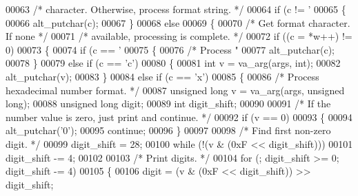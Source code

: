 \begin{DoxyCode}
{{{{00063         \textcolor{comment}{/* character.  Otherwise, process format string. */}
00064         \textcolor{keywordflow}{if} (c != \textcolor{charliteral}{'%
00065         \{
00066             alt_putchar(c);
00067         \}
00068         \textcolor{keywordflow}{else}
00069         \{
00070             \textcolor{comment}{/* Get format character.  If none     */}
00071             \textcolor{comment}{/* available, processing is complete. */}
00072             \textcolor{keywordflow}{if} ((c = *w++) != 0)
00073             \{
00074                 \textcolor{keywordflow}{if} (c == \textcolor{charliteral}{'%
00075                 \{
00076                     \textcolor{comment}{/* Process "%
00077                     alt_putchar(c);
00078                 \} 
00079                 \textcolor{keywordflow}{else} \textcolor{keywordflow}{if} (c == \textcolor{charliteral}{'c'})
00080                 \{
00081                     \textcolor{keywordtype}{int} v = va\_arg(args, \textcolor{keywordtype}{int});
00082                     alt_putchar(v);
00083                 \}
00084                 \textcolor{keywordflow}{else} \textcolor{keywordflow}{if} (c == \textcolor{charliteral}{'x'})
00085                 \{
00086                     \textcolor{comment}{/* Process hexadecimal number format. */}
00087                     \textcolor{keywordtype}{unsigned} \textcolor{keywordtype}{long} v = va\_arg(args, \textcolor{keywordtype}{unsigned} \textcolor{keywordtype}{long});
00088                     \textcolor{keywordtype}{unsigned} \textcolor{keywordtype}{long} digit;
00089                     \textcolor{keywordtype}{int} digit\_shift;
00090 
00091                     \textcolor{comment}{/* If the number value is zero, just print and continue. */}
00092                     \textcolor{keywordflow}{if} (v == 0)
00093                     \{
00094                         alt_putchar(\textcolor{charliteral}{'0'});
00095                         \textcolor{keywordflow}{continue};
00096                     \}
00097 
00098                     \textcolor{comment}{/* Find first non-zero digit. */}
00099                     digit\_shift = 28;
00100                     \textcolor{keywordflow}{while} (!(v & (0xF << digit\_shift)))
00101                         digit\_shift -= 4;
00102 
00103                     \textcolor{comment}{/* Print digits. */}
00104                     \textcolor{keywordflow}{for} (; digit\_shift >= 0; digit\_shift -= 4)
00105                     \{
00106                         digit = (v & (0xF << digit\_shift)) >> digit\_shift;
}}}}}}}
\end{DoxyCode}
